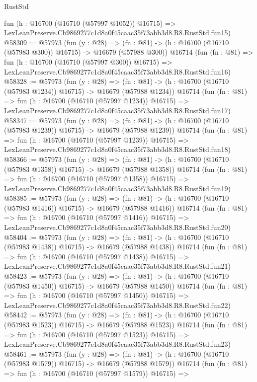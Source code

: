 \begin{lexlean}{RustStd}
\begin{coremodule}
    fun (h : @16700 (@16710 (@57997 @1052)) @16715) =>
    LexLeanPreserve.Cb9869277c1d8a0f45caac35f73abb3d8.R8.RustStd.fun15)
@58309 := @57973
    (fun (y : @28) =>
    (fn : @81) -> (h : @16700 (@16710 (@57983 @300)) @16715) -> @16679 (@57988 @300))
    @16714
    (fun (fn : @81) =>
    fun (h : @16700 (@16710 (@57997 @300)) @16715) =>
    LexLeanPreserve.Cb9869277c1d8a0f45caac35f73abb3d8.R8.RustStd.fun16)
@58328 := @57973
    (fun (y : @28) =>
    (fn : @81) -> (h : @16700 (@16710 (@57983 @1234)) @16715) -> @16679 (@57988 @1234))
    @16714
    (fun (fn : @81) =>
    fun (h : @16700 (@16710 (@57997 @1234)) @16715) =>
    LexLeanPreserve.Cb9869277c1d8a0f45caac35f73abb3d8.R8.RustStd.fun17)
@58347 := @57973
    (fun (y : @28) =>
    (fn : @81) -> (h : @16700 (@16710 (@57983 @1239)) @16715) -> @16679 (@57988 @1239))
    @16714
    (fun (fn : @81) =>
    fun (h : @16700 (@16710 (@57997 @1239)) @16715) =>
    LexLeanPreserve.Cb9869277c1d8a0f45caac35f73abb3d8.R8.RustStd.fun18)
@58366 := @57973
    (fun (y : @28) =>
    (fn : @81) -> (h : @16700 (@16710 (@57983 @1358)) @16715) -> @16679 (@57988 @1358))
    @16714
    (fun (fn : @81) =>
    fun (h : @16700 (@16710 (@57997 @1358)) @16715) =>
    LexLeanPreserve.Cb9869277c1d8a0f45caac35f73abb3d8.R8.RustStd.fun19)
@58385 := @57973
    (fun (y : @28) =>
    (fn : @81) -> (h : @16700 (@16710 (@57983 @1416)) @16715) -> @16679 (@57988 @1416))
    @16714
    (fun (fn : @81) =>
    fun (h : @16700 (@16710 (@57997 @1416)) @16715) =>
    LexLeanPreserve.Cb9869277c1d8a0f45caac35f73abb3d8.R8.RustStd.fun20)
@58404 := @57973
    (fun (y : @28) =>
    (fn : @81) -> (h : @16700 (@16710 (@57983 @1438)) @16715) -> @16679 (@57988 @1438))
    @16714
    (fun (fn : @81) =>
    fun (h : @16700 (@16710 (@57997 @1438)) @16715) =>
    LexLeanPreserve.Cb9869277c1d8a0f45caac35f73abb3d8.R8.RustStd.fun21)
@58423 := @57973
    (fun (y : @28) =>
    (fn : @81) -> (h : @16700 (@16710 (@57983 @1450)) @16715) -> @16679 (@57988 @1450))
    @16714
    (fun (fn : @81) =>
    fun (h : @16700 (@16710 (@57997 @1450)) @16715) =>
    LexLeanPreserve.Cb9869277c1d8a0f45caac35f73abb3d8.R8.RustStd.fun22)
@58442 := @57973
    (fun (y : @28) =>
    (fn : @81) -> (h : @16700 (@16710 (@57983 @1523)) @16715) -> @16679 (@57988 @1523))
    @16714
    (fun (fn : @81) =>
    fun (h : @16700 (@16710 (@57997 @1523)) @16715) =>
    LexLeanPreserve.Cb9869277c1d8a0f45caac35f73abb3d8.R8.RustStd.fun23)
@58461 := @57973
    (fun (y : @28) =>
    (fn : @81) -> (h : @16700 (@16710 (@57983 @1579)) @16715) -> @16679 (@57988 @1579))
    @16714
    (fun (fn : @81) =>
    fun (h : @16700 (@16710 (@57997 @1579)) @16715) =>

\end{coremodule}
\end{lexlean}
